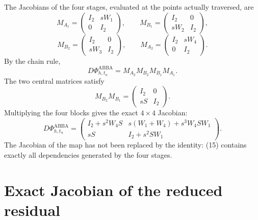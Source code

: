 \documentclass[11pt,a4paper]{article}
\newcommand{\Id}{I}
\newcommand{\PhiAB}{\Phi^{\mathrm{ABBA}}_{h,t_n}}
\begin{document}
The Jacobians of the four stages, evaluated at the points actually traversed, are
\[
 M_{A_1}=
 \begin{pmatrix}
  \Id_2&sW_1\\0&\Id_2
 \end{pmatrix},
 \qquad
 M_{B_1}=
 \begin{pmatrix}
  \Id_2&0\\sW_2&\Id_2
 \end{pmatrix},
\]
\[
 M_{B_2}=
 \begin{pmatrix}
  \Id_2&0\\sW_3&\Id_2
 \end{pmatrix},
 \qquad
 M_{A_2}=
 \begin{pmatrix}
  \Id_2&sW_4\\0&\Id_2
 \end{pmatrix}.
\]
By the chain rule,
\[
 \boxed{
 D\PhiAB=M_{A_2}M_{B_2}M_{B_1}M_{A_1}.
 } \tag{14}
\]
The two central matrices satisfy
\[
 M_{B_2}M_{B_1}
 =
 \begin{pmatrix}
  \Id_2&0\\sS&\Id_2
 \end{pmatrix}.
\]
Multiplying the four blocks gives the exact $4\times4$ Jacobian:
\[
 \boxed{
 D\PhiAB=
 \begin{pmatrix}
  \Id_2+s^2W_4S
  &s(W_1+W_4)+s^3W_4SW_1\\[2mm]
  sS
  &\Id_2+s^2SW_1
 \end{pmatrix}.
 } \tag{15}
\]
The Jacobian of the map has not been replaced by the identity: (15) contains exactly all
dependencies generated by the four stages.

\section{Exact Jacobian of the reduced residual}
\end{document}

